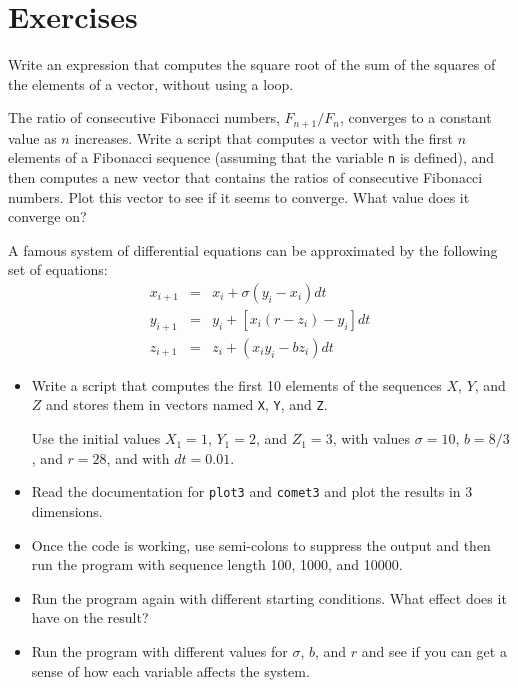 \documentclass[
]{book}
\numberwithin{Answer}{chapter}
\numberwithin{Exercise}{chapter}
\begin{document}
\section{Exercises}

\begin{ex}
Write an expression that computes the square root of the sum of the squares of the elements of a vector, without using a loop.
\end{ex}

\begin{ex}
\label{ex:fibratio}

The ratio of consecutive Fibonacci numbers, $F_{n+1}/F_{n}$, converges
to a constant value as $n$ increases.  Write a script that computes
a vector with the first $n$ elements of a Fibonacci sequence (assuming
that the variable {\tt n} is defined), and then computes a new
vector that contains the ratios of consecutive Fibonacci numbers.
Plot this vector to see if it seems to converge.  What value does
it converge on?

\end{ex}

\begin{ex}
A famous system of differential equations can be approximated
by the following set of equations:
%
\begin{eqnarray}
x_{i+1} &=& x_i + \sigma \left( y_i - x_i \right) dt  \\
y_{i+1} &=& y_i + \left[ x_i (r - z_i) - y_i \right] dt   \\
z_{i+1} &=& z_i + \left( x_i y_i - b z_i \right) dt
\end{eqnarray}
%
\begin{itemize}

\item Write a script that computes the first 10 elements of the sequences
$X$, $Y$, and $Z$ and stores them in vectors named {\tt X}, {\tt Y},
and {\tt Z}.

Use the initial values $X_1 = 1$, $Y_1 = 2$, and $Z_1 = 3$, with values
$\sigma = 10$, $b = 8/3$, and $r = 28$, and with $dt = 0.01$.

\item Read the documentation for {\tt plot3} and {\tt comet3} and
plot the results in 3 dimensions.

\item Once the code is working, use semi-colons to suppress the output
and then run the program with sequence length 100, 1000, and 10000.

\item Run the program again with different starting conditions.
What effect does it have on the result?

\item Run the program with different values for $\sigma$, $b$, and $r$
and see if you can get a sense of how each variable affects the
system.

\end{itemize}

\end{ex}
\end{document}
